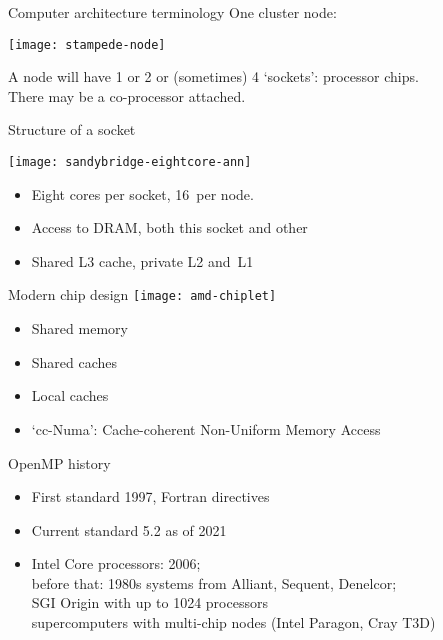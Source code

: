 
\begin{numberedframe}{Computer architecture terminology}
  One cluster node:

  \texttt{[image: stampede-node]}

  A node will have 1 or 2 or (sometimes) 4 `sockets': processor
  chips.\\
  There may be a co-processor attached.
\end{numberedframe}

\begin{numberedframe}{Structure of a socket}

  \begin{multicols}{2}
    \hbox{\texttt{[image: sandybridge-eightcore-ann]}}
    \columnbreak
    \begin{itemize}
    \item Eight cores per socket, 16~per node.
    \item Access to DRAM, both this socket and other
    \item Shared L3 cache, private L2 and~L1
    \end{itemize}
  \end{multicols}
\end{numberedframe}

\begin{numberedframe}{Modern chip design}
\texttt{[image: amd-chiplet]}
\begin{itemize}
\item Shared memory
\item Shared caches
\item Local caches
\item `cc-Numa': Cache-coherent Non-Uniform Memory Access
\end{itemize}
\end{numberedframe}

\begin{numberedframe}{OpenMP history}
  \begin{itemize}
  \item First standard 1997, Fortran directives
  \item Current standard 5.2 as of 2021
  \item Intel Core processors: 2006;\\
    before that: 1980s systems from Alliant, Sequent, Denelcor;\\
    SGI Origin with up to 1024 processors\\
    supercomputers with multi-chip nodes (Intel Paragon, Cray T3D)
  \end{itemize}
\end{numberedframe}

